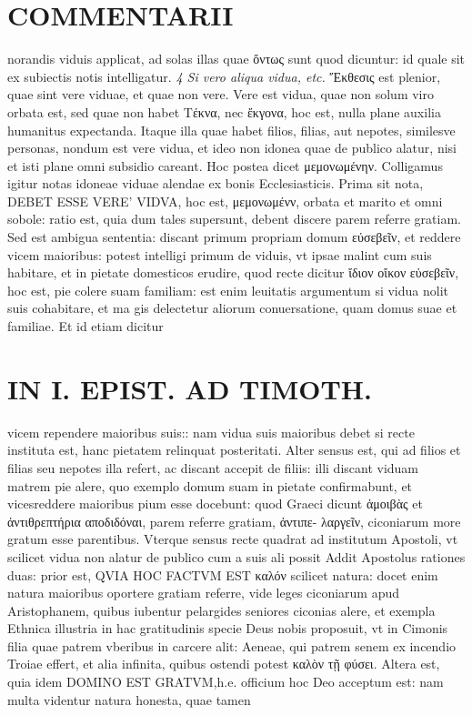 \documentclass{article}
\begin{document}
\begin{pages}
\section*{COMMENTARII }
\marginpar{[ p.122 ]}\pstart norandis viduis applicat, ad solas illas quae ὄντως sunt quod dicuntur: id quale sit ex subiectis notis intelligatur.  \pend
\textit{4 Si vero aliqua vidua, etc. }\pstart Ἔκθεσις est plenior, quae sint vere viduae, et quae non vere. Vere est vidua, quae non solum viro orbata est, sed quae non habet Τέκνα, nec ἔκγονα, hoc est, nulla plane auxilia humanitus expectanda.  \pend\pstart Itaque illa quae habet filios, filias, aut nepotes, similesve personas, nondum est vere vidua, et ideo non idonea quae de publico alatur, nisi et isti plane omni subsidio careant. Hoc postea dicet μεμονωμένην. Colligamus igitur notas idoneae viduae alendae ex bonis Ecclesiasticis. Prima sit nota, DEBET ESSE VERE' VIDVA, hoc est, μεμονωμένν, orbata et marito et omni sobole: ratio est, quia dum tales supersunt, debent discere parem referre gratiam. Sed est ambigua sententia: discant primum propriam domum εύσεβεῖν, et reddere vicem maioribus: potest intelligi primum de viduis, vt ipsae malint cum suis habitare, et in pietate domesticos erudire, quod recte dicitur ἴδιον οἴκον εὐσεβεῖν, hoc est, pie colere suam familiam: est enim leuitatis argumentum si vidua nolit suis cohabitare, et ma gis delectetur aliorum conuersatione, quam domus suae et familiae. Et id etiam dicitur  \pend
\section*{IN I. EPIST. AD TIMOTH. }
\marginpar{[ p.123 ]}\pstart vicem rependere maioribus suis:: nam vidua suis maioribus debet si recte instituta est, hanc pietatem relinquat posteritati. Alter sensus est, qui ad filios et filias seu nepotes illa refert, ac discant accepit de filiis: illi discant viduam matrem pie alere, quo exemplo domum suam in pietate confirmabunt, et vicesreddere maioribus pium esse docebunt: quod Graeci dicunt ἁμοιβὰς et ἀντιθρεπτήρια αποδιδόναι, parem referre gratiam, ἀντιπε- λαργεῖν, ciconiarum more gratum esse parentibus. Vterque sensus recte quadrat ad institutum Apostoli, vt scilicet vidua non alatur de publico cum a suis ali possit  \pend\pstart Addit Apostolus rationes duas: prior est, QVIA HOC FACTVM EST καλόν scilicet natura: docet enim natura maioribus oportere gratiam referre, vide leges ciconiarum apud Aristophanem, quibus iubentur pelargides seniores ciconias alere, et exempla Ethnica illustria in hac gratitudinis specie Deus nobis proposuit, vt in Cimonis filia quae patrem vberibus in carcere alit: Aeneae, qui patrem senem ex incendio Troiae effert, et alia infinita, quibus ostendi potest καλὸν τῇ φύσει.  \pend\pstart Altera est, quia idem DOMINO EST GRATVM,h.e. officium hoc Deo acceptum est: nam multa videntur natura honesta, quae tamen  \pend

\end{pages}
\end{document}

